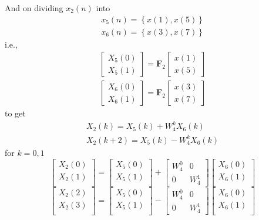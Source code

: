 \documentclass[journal,12pt,twocolumn]{IEEEtran}
\providecommand{\cbrak}[1]{\ensuremath{\left\{#1\right\}}}
\let\vec\mathbf
\numberwithin{equation}{section}
\renewcommand\thesection{\arabic{section}}
\newcommand{\mymat}[1]{\ensuremath{\begin{bmatrix}#1\end{bmatrix}}}
\begin{document}
\begin{enumerate}[label=\thesection.\arabic*]
	And on dividing $x_2(n)$ into
	\begin{align}
		x_5(n) = \cbrak{x(1), x(5)} \\
		x_6(n) = \cbrak{x(3), x(7)}
	\end{align}
	i.e.,
	\begin{align}
		\mymat{X_5(0) \\ X_5(1)} = \vec{F}_2 \mymat{x(1) \\ x(5)} \\
		\mymat{X_6(0) \\ X_6(1)} = \vec{F}_2 \mymat{x(3) \\ x(7)}
	\end{align}
	to get
	\begin{align}
		X_2(k) = X_5(k) + W_4^k X_6(k) \\
		X_2(k + 2) = X_5(k) - W_4^k X_6(k) 
	\end{align}
	for $k = 0, 1$
\begin{equation}
\begin{bmatrix}
X_{2}(0) \\ 
X_{2}(1)\\ 
\end{bmatrix}
=
\begin{bmatrix}
X_{5}(0) \\ 
X_{5}(1)\\ 
\end{bmatrix}
+
\begin{bmatrix}
W^{0}_{4} & 0\\
0 & W^{1}_{4}
\end{bmatrix}
\begin{bmatrix}
X_{6}(0) \\ 
X_{6}(1) \\ 
\end{bmatrix}
\end{equation}
\begin{equation}
\begin{bmatrix}
X_{2}(2) \\ 
X_{2}(3)\\ 
\end{bmatrix}
=
\begin{bmatrix}
X_{5}(0) \\ 
X_{5}(1)\\ 
\end{bmatrix}
-
\begin{bmatrix}
W^{0}_{4} & 0\\
0 & W^{1}_{4}
\end{bmatrix}
\begin{bmatrix}
X_{6}(0) \\ 
X_{6}(1) \\ 
\end{bmatrix}
\end{equation}
	

\end{enumerate}
\end{document}
